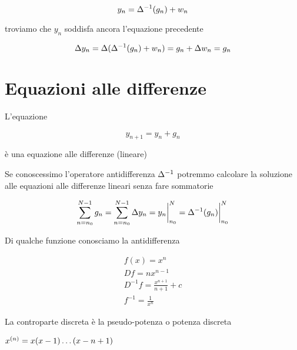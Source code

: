 \begin{equation}
	y_n
	=
	\Delta^{-1}
	(g_n)
	+
	w_n
\end{equation}

troviamo che $y_n$ soddisfa ancora l'equazione precedente

\begin{equation}
	\Delta
	y_n
	=
	\Delta(
		\Delta^{-1}
		(g_n)
		+
		w_n)
	=
	g_n
	+
	\Delta
		w_n
	=
	g_n
\end{equation}

\section{Equazioni alle differenze}

\begin{definition}
	L'equazione
	
	\begin{equation}
		y_{n+1} = y_n + g_n
	\end{equation}
	
	è una equazione alle differenze (lineare)
\end{definition}

Se conoscessimo l'operatore antidifferenza $\Delta^{-1}$ potremmo calcolare la soluzione alle equazioni alle differenze lineari senza fare sommatorie

\begin{equation}
	\sum
		\limits_{n=n_0}^{N-1}
		g_n
	=
	\sum
		\limits_{n=n_0}^{N-1}
		\Delta y_n
	=
	y_n \bigg \rvert_{n_0}^{N}
	=
	\Delta^{-1} (g_n) \bigg \rvert_{n_0}^{N}	
\end{equation}

Di qualche funzione conosciamo la antidifferenza

\begin{example}
	\begin{align*}
		f(x) = x^n
		\\
		D f = n x^{n-1}
		\\
		D^{-1} f = \frac{x^{n+1}}{n+1} + c
		\\
		f^{-1} = \frac{1}{x^n} 
	\end{align*}
\end{example}

La controparte discreta è la pseudo-potenza o potenza discreta

\begin{definition}[Pseudopotenza]
	
	$x^{(n)} = x(x-1) \dots (x-n+1)$
\end{definition}

